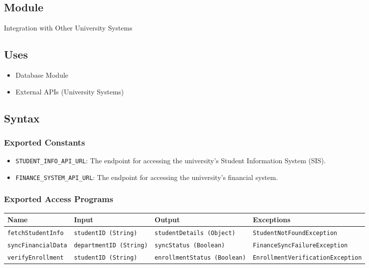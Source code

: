 \documentclass[12pt, titlepage]{article}
\begin{document}
\subsection{Module}
Integration with Other University Systems

\subsection{Uses}
\begin{itemize}
    \item Database Module
    \item External APIs (University Systems)
\end{itemize}

\subsection{Syntax}

\subsubsection{Exported Constants}
\begin{itemize}
    \item \texttt{STUDENT\_INFO\_API\_URL}: The endpoint for accessing the university’s Student Information System (SIS).
    \item \texttt{FINANCE\_SYSTEM\_API\_URL}: The endpoint for accessing the university’s financial system.
\end{itemize}

\subsubsection{Exported Access Programs}
\begin{center}
    \begin{tabular}{|p{3cm}|p{4cm}|p{4cm}|p{4cm}|}
        \hline
        \textbf{Name} & \textbf{Input} & \textbf{Output} & \textbf{Exceptions} \\
        \hline
        \texttt{fetchStudentInfo} & \texttt{studentID (String)} & \texttt{studentDetails (Object)} & \texttt{StudentNotFoundException} \\
        \hline
        \texttt{syncFinancialData} & \texttt{departmentID (String)} & \texttt{syncStatus (Boolean)} & \texttt{FinanceSyncFailureException} \\
        \hline
        \texttt{verifyEnrollment} & \texttt{studentID (String)} & \texttt{enrollmentStatus (Boolean)} & \texttt{EnrollmentVerificationException} \\
        \hline
    \end{tabular}
\end{center}
\end{document}
